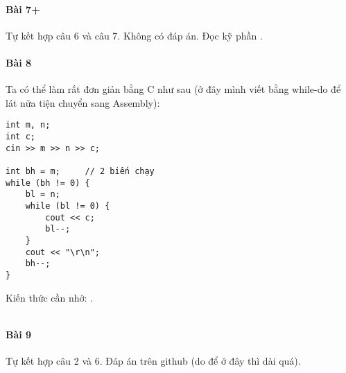 \documentclass[main.tex]{subfiles}
\begin{document}
\paragraph*{Bài 7+}
Tự kết hợp câu 6 và câu 7. Không có đáp án. Đọc kỹ phần .

\paragraph*{Bài 8}
Ta có thể làm rất đơn giản bằng C như sau (ở đây mình viết bằng while-do để lát nữa tiện chuyển sang Assembly):
\begin{verbatim}
int m, n;
int c;
cin >> m >> n >> c;

int bh = m;     // 2 biến chạy
while (bh != 0) {
    bl = n;
    while (bl != 0) {
        cout << c;
        bl--;
    }
    cout << "\r\n";
    bh--;
}
\end{verbatim}
Kiến thức cần nhớ: .
\inputminted[linenos,breaklines]{nasm}{answer_source/Bai8.asm}
\paragraph*{Bài 9}
Tự kết hợp câu 2 và 6. Đáp án trên github (do để ở đây thì dài quá).
\end{document}
